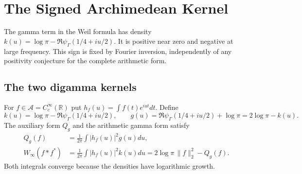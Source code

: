 \chapter{The Signed Archimedean Kernel}
\label{v4-arith:w6-a:ATP-direct-obstruction}

The gamma term in the Weil formula has density
$k(u)=\log\pi-\Re\psi_\Gamma(1/4+iu/2)$.
It is positive near zero and negative at large frequency.
This sign is fixed by Fourier inversion, independently of any
positivity conjecture for the complete arithmetic form.

\section{The two digamma kernels}
\label{v4-arith:w6-a:context}
\label{v4-arith:w6-a:sources}

\begin{definition}
\label{v4-arith:w6-a:def:g}
For $f\in\mathscr A=C_c^\infty(\mathbb R)$ put
$h_f(u)=\int f(t)e^{iut}dt$. Define
\begin{equation}
 k(u)=\log\pi-\Re\psi_\Gamma(1/4+iu/2),\qquad
 g(u)=\Re\psi_\Gamma(1/4+iu/2)+\log\pi=2\log\pi-k(u).
 \label{v4-arith:w6-a:eq:g-definition}
\end{equation}
The auxiliary form $Q_g$ and the arithmetic gamma form satisfy
\begin{equation}
 \begin{split}
 Q_g(f)&=\frac1{2\pi}\int |h_f(u)|^2g(u)du,\\
 W_\infty(f*f^*)&=\frac1{2\pi}\int |h_f(u)|^2k(u)du
              =2\log\pi\,\|f\|_2^2-Q_g(f).
 \end{split}
 \label{v4-arith:w6-a:eq:W-arch-as-g}
\end{equation}
Both integrals converge because the densities have logarithmic growth.
\end{definition}

